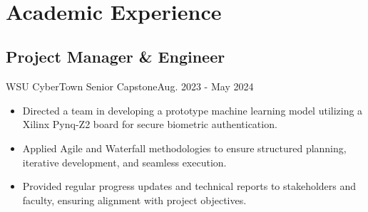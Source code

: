 \\ \section{Academic Experience}
\subsection{Project Manager \& Engineer}{WSU CyberTown Senior Capstone}{Aug. 2023 - May 2024}
\begin{itemize}
    \item Directed a team in developing a prototype machine learning model utilizing a Xilinx Pynq-Z2 board for secure biometric authentication.
    \item Applied Agile and Waterfall methodologies to ensure structured planning, iterative development, and seamless execution.
    \item Provided regular progress updates and technical reports to stakeholders and faculty, ensuring alignment with project objectives.
\end{itemize}
